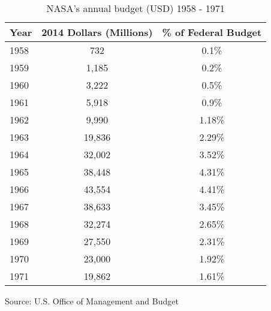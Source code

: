 \documentclass[10pt, journal]{IEEEtran}
\begin{document}
\begin{table}
\centering 
\caption{NASA's annual budget (USD) 1958 - 1971}
\label{table:nasabudget}

\begin{threeparttable}
	\begin{tabular}{| l | c | c |}
		\hline
		\textbf{Year} & \textbf{2014 Dollars (Millions)} & \textbf{\% of Federal Budget} \\ \hline
		1958 & 732 & 0.1\% \\ \hline
		1959 & 1,185 & 0.2\%\\ \hline
		1960 & 3,222 & 0.5\%\\ \hline
		1961 & 5,918 & 0.9\%\\ \hline
		1962 & 9,990 & 1.18\%\\ \hline
		1963 & 19,836 & 2.29\%\\ \hline
		1964 & 32,002 & 3.52\%\\ \hline
		1965 & 38,448 & 4.31\%\\ \hline
		1966 & 43,554 & 4.41\%\\ \hline
		1967 & 38,633 & 3.45\%\\ \hline
		1968 & 32,274 & 2.65\%\\ \hline
		1969 & 27,550 & 2.31\%	\\ \hline
		1970 & 23,000 & 1.92\% \\ \hline
		1971 & 19,862 & 1.61\% \\ \hline
	\end{tabular}
	\footnotesize Source: U.S. Office of Management and Budget
\end{threeparttable}
\end{table}
\end{document}

